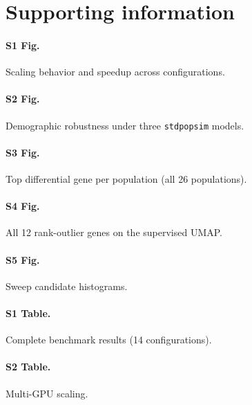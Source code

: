 \documentclass[10pt,letterpaper]{article}
\begin{document}



\section*{Supporting information}

\paragraph*{S1 Fig.} Scaling behavior and speedup across configurations.
\paragraph*{S2 Fig.} Demographic robustness under three \texttt{stdpopsim} models.
\paragraph*{S3 Fig.} Top differential gene per population (all 26 populations).
\paragraph*{S4 Fig.} All 12 rank-outlier genes on the supervised UMAP.
\paragraph*{S5 Fig.} Sweep candidate histograms.
\paragraph*{S1 Table.} Complete benchmark results (14 configurations).
\paragraph*{S2 Table.} Multi-GPU scaling.
\end{document}
